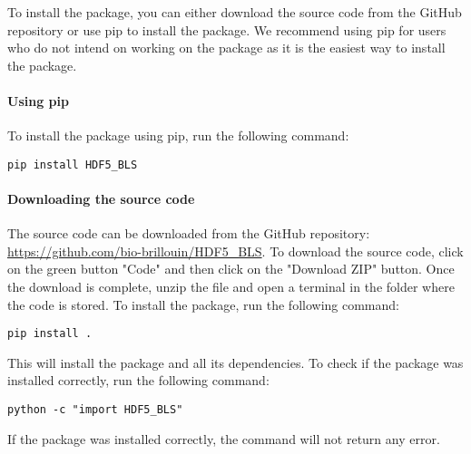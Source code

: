 To install the package, you can either download the source code from the GitHub repository or use pip to install the package. We recommend using pip for users who do not intend on working on the package as it is the easiest way to install the package.

\paragraph{Using pip}
    To install the package using pip, run the following command:
\begin{lstlisting}
pip install HDF5_BLS
\end{lstlisting}   

\paragraph{Downloading the source code}
    The source code can be downloaded from the GitHub repository: \url{https://github.com/bio-brillouin/HDF5_BLS}. To download the source code, click on the green button "Code" and then click on the "Download ZIP" button. Once the download is complete, unzip the file and open a terminal in the folder where the code is stored. To install the package, run the following command:
\begin{lstlisting}
pip install .
\end{lstlisting}

    This will install the package and all its dependencies. To check if the package was installed correctly, run the following command:
\begin{lstlisting}
python -c "import HDF5_BLS"
\end{lstlisting}

    If the package was installed correctly, the command will not return any error.
 